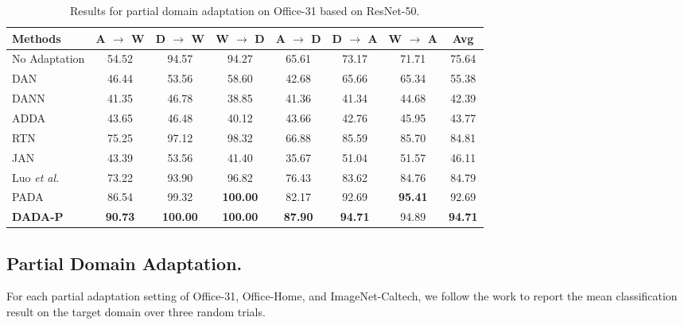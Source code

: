 \documentclass[letterpaper]{article} \usepackage{aaai20}  \usepackage{times}  \usepackage{helvet} \usepackage{courier}  \usepackage[hyphens]{url}  \usepackage{graphicx} \urlstyle{rm} \def\UrlFont{\rm}  \usepackage{graphicx}  \frenchspacing  \setlength{\pdfpagewidth}{8.5in}  \setlength{\pdfpageheight}{11in}
\begin{document}
\begin{table*}[!htb]
	\begin{center}
		\caption{Results for partial domain adaptation on Office-31 based on ResNet-50.}
		\label{table:results_office31_partial_transfer}
		\begin{tabular}{lccccccc}
			\hline
			Methods  & A $\rightarrow$ W & D $\rightarrow$ W & W $\rightarrow$ D & A $\rightarrow$ D & D $\rightarrow$ A & W $\rightarrow$ A & Avg \\
			\hline
			No Adaptation \cite{resnet} & 54.52 & 94.57 & 94.27 & 65.61 & 73.17 & 71.71 & 75.64 \\ 
			
			DAN \cite{dan}       & 46.44 & 53.56 & 58.60 & 42.68 & 65.66 & 65.34 & 55.38 \\ 
			
			DANN \cite{dann}     & 41.35 & 46.78 & 38.85 & 41.36 & 41.34 & 44.68 & 42.39 \\ 
			
			ADDA \cite{adda}     & 43.65 & 46.48 & 40.12 & 43.66 & 42.76 & 45.95 & 43.77 \\ 
			
			RTN \cite{rtn}       & 75.25 & 97.12 & 98.32 & 66.88 & 85.59 & 85.70 & 84.81 \\ 
			
			JAN \cite{jan}       & 43.39 & 53.56 & 41.40 & 35.67 & 51.04 & 51.57 & 46.11 \\ 
			
			Luo \emph{et al.} \cite{lel}   & 73.22 & 93.90 & 96.82 & 76.43 & 83.62 & 84.76 & 84.79 \\ 
			
			PADA \cite{pada}     & 86.54 & 99.32 & \textbf{100.00} & 82.17 & 92.69 & \textbf{95.41} & 92.69 \\ 
			\hline
			\textbf{DADA-P}    & \textbf{90.73} & \textbf{100.00} & \textbf{100.00} & \textbf{87.90} & \textbf{94.71} & 94.89 & \textbf{94.71} \\ 
			\hline
		\end{tabular}
	\end{center}
\end{table*}

\subsection{Partial Domain Adaptation. }

For each partial adaptation setting of Office-31, Office-Home, and ImageNet-Caltech, we follow the work \cite{pada} to report the mean classification result on the target domain over three random trials.
\end{document}
